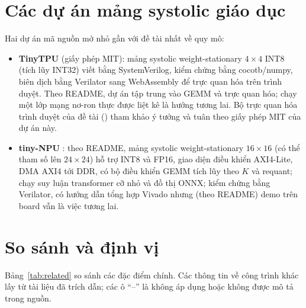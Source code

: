 \section{Các dự án mảng systolic giáo dục}
Hai dự án mã nguồn mở nhỏ gần với đề tài nhất về quy mô:
\begin{itemize}
  \item \textbf{TinyTPU} \cite{tinytpu} (giấy phép MIT): mảng systolic weight-stationary $4\times4$ INT8 (tích lũy INT32) viết bằng SystemVerilog, kiểm chứng bằng cocotb/numpy, biên dịch bằng Verilator sang WebAssembly để trực quan hóa trên trình duyệt. Theo README, dự án tập trung vào GEMM và trực quan hóa; chạy một lớp mạng nơ-ron thực được liệt kê là hướng tương lai. Bộ trực quan hóa trình duyệt của đề tài () tham khảo ý tưởng và tuân theo giấy phép MIT của dự án này.
  \item \textbf{tiny-NPU} \cite{tinynpu}: theo README, mảng systolic weight-stationary $16\times16$ (có thể tham số lên $24\times24$) hỗ trợ INT8 và FP16, giao diện điều khiển AXI4-Lite, DMA AXI4 tới DDR, có bộ điều khiển GEMM tích lũy theo $K$ và requant; chạy suy luận transformer cỡ nhỏ và đồ thị ONNX; kiểm chứng bằng Verilator, có hướng dẫn tổng hợp Vivado nhưng (theo README) demo trên board vẫn là việc tương lai.
\end{itemize}

\section{So sánh và định vị}
Bảng~\ref{tab:related} so sánh các đặc điểm chính. Các thông tin về công trình khác lấy từ tài liệu đã trích dẫn; các ô ``--'' là không áp dụng hoặc không được mô tả trong nguồn.

